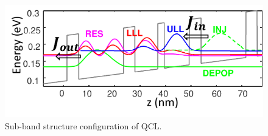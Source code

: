 \documentclass[11pt,final]{scrbook}
\begin{document}
\begin{figure}[htbp]
\begin{center}
\includegraphics[scale=1.2]{images/WFs.pdf}
\caption{Sub-band structure configuration of QCL.}
\label{fig:4Levels}
\end{center}
\end{figure}
\end{document}
